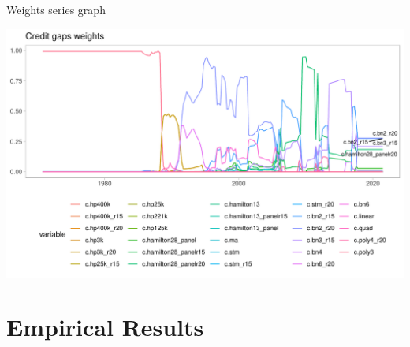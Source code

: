 \documentclass[
  ignorenonframetext,
]{beamer}
\begin{document}
\begin{frame}{Weights series graph}
\protect\hypertarget{weights-series-graph}{}
\begin{center}\includegraphics[width=1\linewidth]{../Data/Output/Graphs/Weights_series} \end{center}
\end{frame}

\hypertarget{empirical-results}{%
\section{Empirical Results}\label{empirical-results}}
\end{document}
